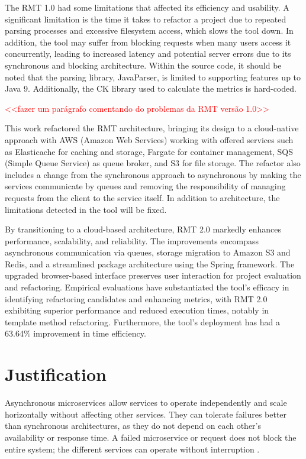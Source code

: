 The RMT 1.0 had some limitations that affected its efficiency and usability. A significant limitation is the time it takes to refactor a project due to repeated parsing processes and excessive filesystem access, which slows the tool down. In addition, the tool may suffer from blocking requests when many users access it concurrently, leading to increased latency and potential server errors due to its synchronous and blocking architecture. Within the source code, it should be noted that the parsing library, JavaParser, is limited to supporting features up to Java 9. Additionally, the CK library used to calculate the metrics is hard-coded.

\textcolor{red}{<<fazer um parágrafo comentando do problemas da RMT versão 1.0>>}

This work refactored the RMT architecture, bringing its design to a cloud-native approach with AWS (Amazon Web Services) working with offered services such as Elasticache for caching and storage, Fargate for container management, SQS (Simple Queue Service) as queue broker, and S3 for file storage. The refactor also includes a change from the synchronous approach to asynchronous by making the services communicate by queues and removing the responsibility of managing requests from the client to the service itself. In addition to architecture, the limitations detected in the tool will be fixed.

By transitioning to a cloud-based architecture, RMT 2.0 markedly enhances performance, scalability, and reliability. The improvements encompass asynchronous communication via queues, storage migration to Amazon S3 and Redis, and a streamlined package architecture using the Spring framework. The upgraded browser-based interface preserves user interaction for project evaluation and refactoring. Empirical evaluations have substantiated the tool's efficacy in identifying refactoring candidates and enhancing metrics, with RMT 2.0 exhibiting superior performance and reduced execution times, notably in template method refactoring. Furthermore, the tool's deployment has had a 63.64\% improvement in time efficiency.


\section{Justification}
Asynchronous microservices allow services to operate independently and scale horizontally without affecting other services. They can tolerate failures better than synchronous architectures, as they do not depend on each other's availability or response time. A failed microservice or request does not block the entire system; the different services can operate without interruption \cite{microservices-comuni}.

